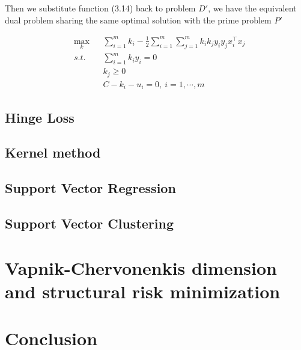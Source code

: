\documentclass[a4paper]{report}
\begin{document}
Then we substitute function (3.14) back to problem $D'$, we have the equivalent dual problem sharing the same optimal solution with the prime problem $P'$

\begin{align*}
    &\max_k & & \sum_{i=1}^m k_i - \frac{1}{2} \sum_{i=1}^m\sum_{j=1}^m k_i k_j y_i y_j x_i^\top x_j \\
    &s.t. \ & & \sum_{i=1}^m k_i y_i=0 \\
    & & & k_j\geq 0\\
    & & & C-k_i-u_i=0,\ i=1,\cdots,m 
\end{align*}

\section{Hinge Loss}
\section{Kernel method}
\section{Support Vector Regression}
\section{Support Vector Clustering}
\chapter{Vapnik-Chervonenkis dimension and structural risk minimization}
\chapter{Conclusion}

{}

\end{document}
